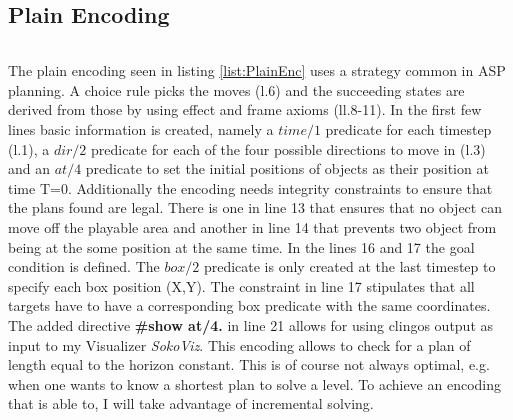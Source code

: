 \documentclass{report}
\begin{document}
\subsection{Plain Encoding}

\begin{lstlisting}[caption={Plain Encoding},label=list:PlainEnc]
\end{lstlisting}
The plain encoding seen in listing \ref{list:PlainEnc} uses a strategy common in ASP planning. A choice rule picks the moves (l.6) and the succeeding states are derived from those by using effect and frame axioms (ll.8-11).
In the first few lines basic information is created, namely a $time/1$ predicate for each timestep (l.1), a $dir/2$ predicate for each of the four possible directions to move in (l.3) and an $at/4$ predicate to set the initial positions of objects as their position at time T=0.
Additionally the encoding needs integrity constraints to ensure that the plans found are legal. There is one in line 13 that ensures that no object can move off the playable area and another in line 14 that prevents two object from being at the some position at the same time.
In the lines 16 and 17 the goal condition is defined. The $box/2$ predicate is only created at the last timestep to specify each box position (X,Y). The constraint in line 17 stipulates that all targets have to have a corresponding box predicate with the same coordinates.
The added directive \textbf{\#show at/4.} in line 21 allows for using clingos output as input to my Visualizer \textit{SokoViz}.
This encoding allows to check for a plan of length equal to the horizon constant. This is of course not always optimal, e.g. when one wants to know a shortest plan to solve a level. To achieve an encoding that is able to, I will take advantage of incremental solving.
\end{document}
